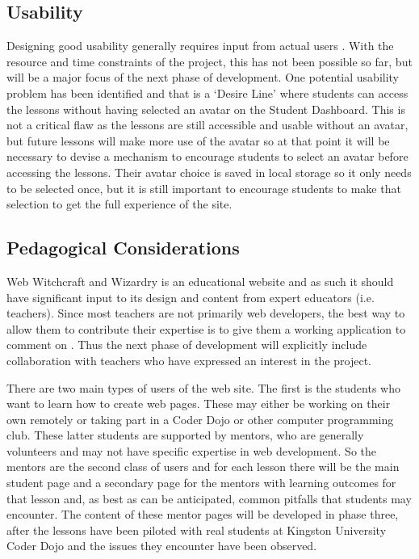 \documentclass[a4paper, 12pt]{article}
\begin{document}
\subsection{Usability}
Designing good usability generally requires input from actual users \citep{norman2013design}. With the resource and time constraints of the project, this has not been possible so far, but will be a major focus of the next phase of development. One potential usability problem has been identified and that is a `Desire Line' \citep{lynch1960image} where students can access the lessons without having selected an avatar on the Student Dashboard. This is not a critical flaw as the lessons are still accessible and usable without an avatar, but future lessons will make more use of the avatar so at that point it will be necessary to devise a mechanism to encourage students to select an avatar before accessing the lessons. Their avatar choice is saved in local storage so it only needs to be selected once, but it is still important to encourage students to make that selection to get the full experience of the site.

\subsection{Pedagogical Considerations}
Web Witchcraft and Wizardry is an educational website and as such it should have significant input to its design and content from expert educators (i.e. teachers). Since most teachers are not primarily web developers, the best way to allow them to contribute their expertise is to give them a working application to comment on \citep{schuler1993participatory}. Thus the next phase of development will explicitly include collaboration with teachers who have expressed an interest in the project.

There are two main types of users of the web site. The first is the students who want to learn how to create web pages. These may either be working on their own remotely or taking part in a Coder Dojo or other computer programming club. These latter students are supported by mentors, who are generally volunteers and may not have specific expertise in web development. So the mentors are the second class of users and for each lesson there will be the main student page and a secondary page for the mentors with learning outcomes for that lesson and, as best as can be anticipated, common pitfalls that students may encounter. The content of these mentor pages will be developed in phase three, after the lessons have been piloted with real students at Kingston University Coder Dojo and the issues they encounter have been observed.
\end{document}
